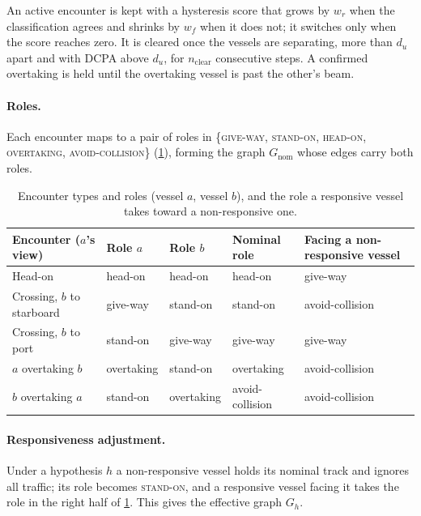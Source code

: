 \documentclass[10pt,a4paper]{article}
\begin{document}
An active encounter is kept with a hysteresis score that grows by $w_r$ when the
classification agrees and shrinks by $w_f$ when it does not; it switches only
when the score reaches zero. It is cleared once the vessels are separating, more
than $d_u$ apart and with DCPA above $d_u$, for $n_{\text{clear}}$ consecutive
steps. A confirmed overtaking is held until the overtaking vessel is past the
other's beam.

\paragraph{Roles.}

Each encounter maps to a pair of roles in \{\textsc{give-way},
\textsc{stand-on}, \textsc{head-on}, \textsc{overtaking},
\textsc{avoid-collision}\} (\cref{tab:roles}), forming the graph
$G_{\text{nom}}$ whose edges carry both roles.

\begin{table}[t]
\centering\small
\caption{Encounter types and roles (vessel $a$, vessel $b$), and the role a responsive vessel takes toward a non-responsive one.}
\label{tab:roles}
\begin{tabular}{@{}lll@{\hspace{2em}}ll@{}}
\toprule
Encounter ($a$'s view) & Role $a$ & Role $b$ & Nominal role & Facing a non-responsive vessel\\
\midrule
Head-on & head-on & head-on & head-on & give-way \\
Crossing, $b$ to starboard & give-way & stand-on & stand-on & avoid-collision \\
Crossing, $b$ to port & stand-on & give-way & give-way & give-way \\
$a$ overtaking $b$ & overtaking & stand-on & overtaking & avoid-collision \\
$b$ overtaking $a$ & stand-on & overtaking & avoid-collision & avoid-collision \\
\bottomrule
\end{tabular}
\end{table}

\paragraph{Responsiveness adjustment.} 

Under a hypothesis $h$ a non-responsive vessel holds its nominal track and
ignores all traffic; its role becomes \textsc{stand-on}, and a responsive vessel
facing it takes the role in the right half of \cref{tab:roles}. This gives the
effective graph $G_h$.
\end{document}
